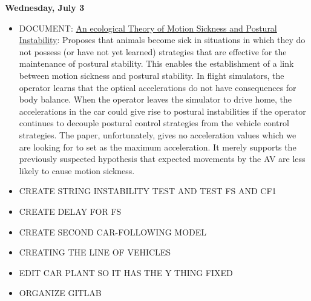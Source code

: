 \documentclass[12pt, letterpaper]{article}
\begin{document}
{\bf Wednesday, July 3} \\
\begin{itemize}
\item DOCUMENT: \href{https://www.tandfonline.com/doi/abs/10.1207/s15326969eco0303_2#.VcToHJNViko}{\color{blue} An ecological Theory of Motion Sickness and Postural Instability}: Proposes that animals become sick in situations in which they do not possess (or have not yet learned) strategies that are effective for the maintenance of postural stability. This enables the establishment of a link between motion sickness and postural stability. In flight simulators, the operator learns that the optical accelerations do not have consequences for body balance. When the operator leaves the simulator to drive home, the accelerations in the car could give rise to postural instabilities if the operator continues to decouple postural control strategies from the vehicle control strategies. The paper, unfortunately, gives no acceleration values which we are looking for to set as the maximum acceleration. It merely supports the previously suspected hypothesis that expected movements by the AV are less likely to cause motion sickness.
\item CREATE STRING INSTABILITY TEST AND TEST FS AND CF1
\item CREATE DELAY FOR FS
\item CREATE SECOND CAR-FOLLOWING MODEL
\item CREATING THE LINE OF VEHICLES
\item EDIT CAR PLANT SO IT HAS THE Y THING FIXED
\item ORGANIZE GITLAB
\end{itemize}
\end{document}
